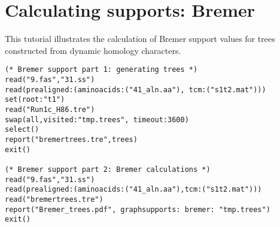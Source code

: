 


\section{Calculating supports: Bremer}{\label{tutorial4}}

This tutorial illustrates the calculation of Bremer support values for trees constructed from dynamic homology characters. 
    
\begin{verbatim}
(* Bremer support part 1: generating trees *)
read("9.fas","31.ss")
read(prealigned:(aminoacids:("41_aln.aa"), tcm:("s1t2.mat")))
set(root:"t1")
read("Run1c_H86.tre")
swap(all,visited:"tmp.trees", timeout:3600)
select()
report("bremertrees.tre",trees)
exit()

(* Bremer support part 2: Bremer calculations *)
read("9.fas","31.ss")
read(prealigned:(aminoacids:("41_aln.aa"),tcm:("s1t2.mat")))
read("bremertrees.tre")
report("Bremer_trees.pdf", graphsupports: bremer: "tmp.trees")
exit()
\end{verbatim}

